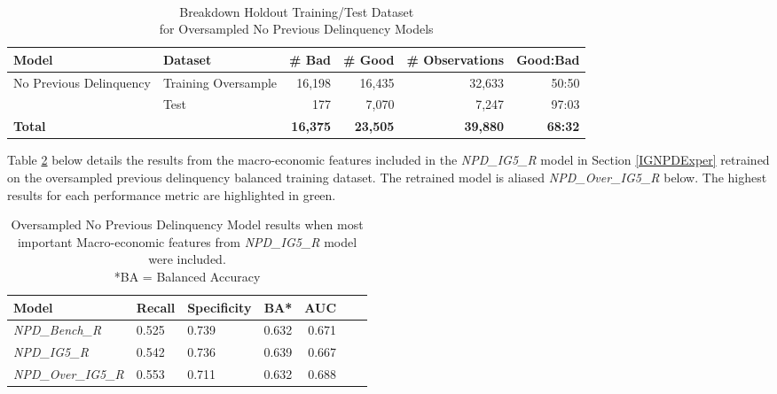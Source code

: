 \begin{table}[H]
	\centering\
	\resizebox{\textwidth}{!}
	{
		\begin{tabular}{l l r r r r}
			\hline
			\textbf{Model} &  \textbf{Dataset} & \textbf{\# Bad} & \textbf{\# Good} & \textbf{\# Observations} & \textbf{Good:Bad} \\
			\hline
			No Previous Delinquency & Training Oversample & 16,198 & 16,435 & 32,633 & 50:50 \\ 
			& Test & 177 & 7,070 & 7,247 & 97:03 	\\\hline
			\textbf{Total}     &  & \textbf{16,375} & \textbf{23,505} & \textbf{39,880} & \textbf{68:32} \\
			\hline
		\end{tabular}
	}
	\caption{Breakdown Holdout Training/Test Dataset \\for Oversampled No Previous Delinquency Models}
	\label{table:oversample_train_testNPD}
\end{table}

Table \ref{table:overNPD} below details the results from the macro-economic features included in the \textit{NPD\_IG5\_R} model in Section \ref{IGNPDExper} retrained on the oversampled previous delinquency balanced training dataset. The retrained model is aliased \textit{NPD\_Over\_IG5\_R} below. The highest results for each performance metric are highlighted in green.

\begin{table}[H]
	\centering
	\small
	\begin{tabular}{l l l r r r r}
		\hline
\textbf{Model} & \textbf{Recall} & \textbf{Specificity} & \textbf{BA*} & \textbf{AUC}  \\ \hline
\textit{NPD\_Bench\_R} & 0.525 & \cellcolor{green!25}0.739 & 0.632 & 0.671   \\ \hline
\textit{NPD\_IG5\_R} & 0.542 & 0.736 & \cellcolor{green!25}0.639 & 0.667   \\ 
\textit{NPD\_Over\_IG5\_R} &  \cellcolor{green!25}0.553 & 0.711 & 0.632 & \cellcolor{green!25}0.688   \\ \hline
	\end{tabular}
	\caption{{Oversampled No Previous Delinquency Model results when most \\important
			Macro-economic features from \textit{NPD\_IG5\_R} model were included.
			\\ *BA = Balanced Accuracy}}
	\label{table:overNPD}
\end{table}

